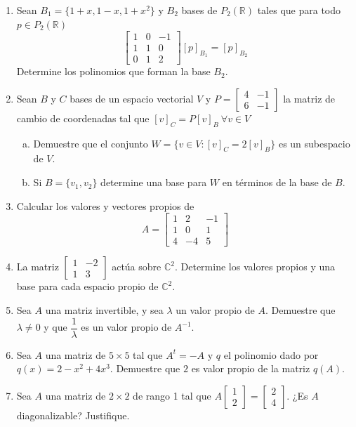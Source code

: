 \documentclass[12pt]{article}
\newenvironment{preguntas}
{\begin{enumerate}\itemsep12pt
	}
	{
	\end{enumerate}
}
\newcommand{\R}{\mathbb{R}}
\begin{document}
\begin{preguntas}
\item Sean $B_1 = \{1+x,1-x,1+x^2\}$ y $B_2$ bases de $P_2(\R)$ tales que para todo $p \in P_2(\R)$
	$$ \begin{bmatrix}
	1 & 0 & -1\\
	1 & 1 & 0 \\
	0 & 1 & 2
	\end{bmatrix} [p]_{B_1} = [p]_{B_2}$$
	Determine los polinomios que forman la base $B_2$.
\item Sean $B$ y $C$ bases de un espacio vectorial $V$ y $P = \begin{bmatrix}4 &-1 \\ 6 & -1\end{bmatrix}$ la matriz de cambio de coordenadas tal que $[v]_C = P[v]_B\ \forall v \in V$
\begin{enumerate}[a)]
\item Demuestre que el conjunto $W = \{v \in V: [v]_C = 2[v]_B\}$ es un subespacio de $V$.
\item Si $B=\{v_1,v_2\}$ determine una base para $W$ en términos de la base de $B$.
\end{enumerate}
\item Calcular los valores y vectores propios de
	$$ A = \begin{bmatrix} 1 & 2 & -1\\ 1 & 0 & 1\\ 4 & -4 & 5\end{bmatrix}$$
\item La matriz $\begin{bmatrix} 1 & -2 \\ 1 & 3 \end{bmatrix}$ actúa sobre $\mathbb{C}^2$. Determine los valores propios y una base para cada espacio propio de $\mathbb{C}^2$.
\item Sea $A$ una matriz invertible, y sea $\lambda$ un valor propio de $A$. Demuestre que $\lambda \neq 0$ y que $\dfrac{1}{\lambda}$ es un valor propio de $A^{-1}$.
\item Sea $A$ una matriz de $5 \times 5$ tal que $A^t = -A$ y $q$ el polinomio dado por $q(x) = 2-x^2+4x^3$. Demuestre que $2$ es valor propio de la matriz $q(A)$.
\item Sea $A$ una matriz de $2\times 2$ de rango 1 tal que $A\begin{bmatrix} 1 \\ 2\end{bmatrix} = \begin{bmatrix} 2 \\ 4 \end{bmatrix}$. ¿Es $A$ diagonalizable? Justifique.

\end{preguntas}
\end{document}
